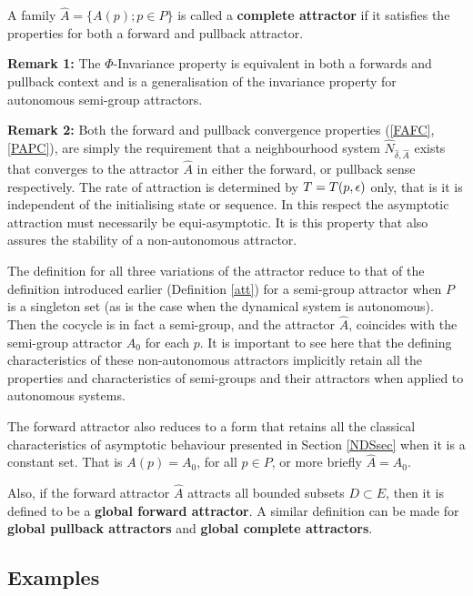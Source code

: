 \begin{defn} \label{CAdef}
  A family $\hat{A} = \{A(p);p \in P\}$ is called a {\bf complete
  attractor} if it satisfies the properties for both a forward and pullback
  attractor.
\end{defn}

{\bf Remark 1:} The $\Phi$-Invariance property is equivalent in
both a forwards and pullback context and is a generalisation of
the invariance property for autonomous semi-group attractors.

{\bf Remark 2:} Both the forward and pullback convergence
properties (\ref{FAFC}, \ref{PAPC}), are simply the requirement
that a neighbourhood system $\hat{N}_{\hat{\delta},\hat{A}}$
exists that converges to the attractor $\hat{A}$ in either the
forward, or pullback sense respectively. The rate of
attraction is determined by $T = T(p, \epsilon)$ only, that is  it is
independent of the initialising state or sequence. In this
respect the asymptotic attraction must necessarily be
equi-asymptotic. It is this property that also assures the
stability of a non-autonomous attractor.

The definition for all three variations of the attractor reduce to
that of the definition introduced earlier (Definition \ref{att})
for a semi-group attractor when $P$ is a singleton set (as is the
case when the dynamical system is autonomous). Then the cocycle is
in fact a semi-group, and the attractor $\hat{A}$, coincides with
the semi-group attractor $A_0$ for each $p$. It is important to
see here that the defining characteristics of these non-autonomous
attractors implicitly retain all the properties and
characteristics of semi-groups and their attractors when applied
to autonomous systems.

The forward attractor also reduces to a form that retains all the classical
characteristics of asymptotic behaviour presented in Section \ref{NDSsec}
when it is a constant set. That is $A(p) = A_0$, for all $p \in P$, or
more briefly $\hat{A} = A_0$.

Also, if the forward attractor $\hat{A}$ attracts all bounded subsets $D \subset E$, then it is defined to be a {\bf global forward attractor}. A similar definition can be made for \textbf{global pullback attractors} and \textbf{global complete attractors}.

\subsection{Examples}

